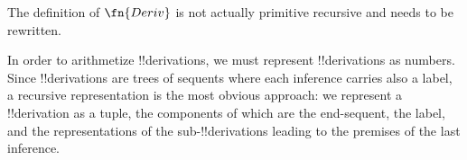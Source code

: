 \documentclass[../../../include/open-logic-section]{subfiles}
\begin{document}

\begin{editorial}
  The definition of $\fn{Deriv}$ is not actually primitive recursive
  and needs to be rewritten.
\end{editorial}

\begin{explain}
In order to arithmetize !!{derivation}s, we must represent
!!{derivation}s as numbers. Since !!{derivation}s are trees of sequents
where each inference carries also a label, a recursive
representation is the most obvious approach: we represent a
!!{derivation} as a tuple, the components of which are the
end-sequent, the label, and the representations of the
sub-!!{derivation}s leading to the premises of the last inference.
\end{explain}
\end{document}
